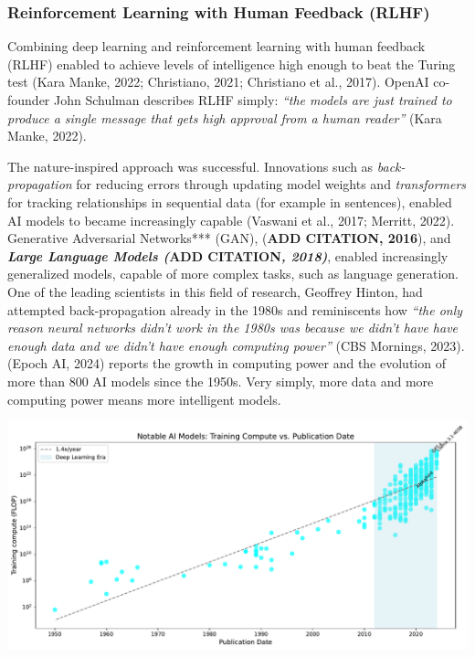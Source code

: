 \documentclass[
  letterpaper,
  DIV=11,
  numbers=noendperiod]{scrartcl}
\begin{document}
\subsubsection{\texorpdfstring{\textbf{Reinforcement Learning with Human
Feedback
(RLHF)}}{Reinforcement Learning with Human Feedback (RLHF)}}\label{reinforcement-learning-with-human-feedback-rlhf}

Combining deep learning and reinforcement learning with human feedback
(RLHF) enabled to achieve levels of intelligence high enough to beat the
Turing test (Kara Manke, 2022; Christiano, 2021; Christiano et al.,
2017). OpenAI co-founder John Schulman describes RLHF simply:
\emph{``the models are just trained to produce a single message that
gets high approval from a human reader''} (Kara Manke, 2022).

The nature-inspired approach was successful. Innovations such as
\emph{back-propagation} for reducing errors through updating model
weights and \emph{transformers} for tracking relationships in sequential
data (for example in sentences), enabled AI models to became
increasingly capable (Vaswani et al., 2017; Merritt, 2022). Generative
Adversarial Networks*** (GAN), (\textbf{ADD CITATION, 2016}), and
\textbf{\emph{Large Language Models (}ADD CITATION\emph{, 2018)}},
enabled increasingly generalized models, capable of more complex tasks,
such as language generation. One of the leading scientists in this field
of research, Geoffrey Hinton, had attempted back-propagation already in
the 1980s and reminiscents how \emph{``the only reason neural networks
didn't work in the 1980s was because we didn't have have enough data and
we didn't have enough computing power''} (CBS Mornings, 2023). (Epoch
AI, 2024) reports the growth in computing power and the evolution of
more than 800 AI models since the 1950s. Very simply, more data and more
computing power means more intelligent models.

\includegraphics{_thesis_files/figure-pdf/cell-26-output-1.pdf}
\end{document}
